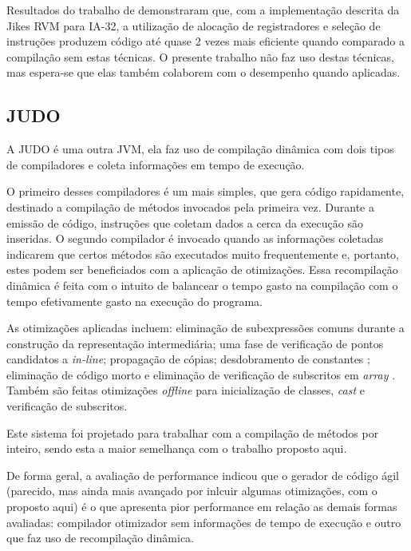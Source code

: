 Resultados do trabalho de  demonstraram que, com a
implementação descrita da Jikes RVM para IA-32, a
utilização de alocação de registradores e seleção de instruções
produzem código até quase 2 vezes mais eficiente quando comparado a
compilação sem estas técnicas. O presente trabalho não
faz uso destas técnicas, mas espera-se que elas também colaborem com
o desempenho quando aplicadas.


\subsection{JUDO}

A JUDO \cite{judo} é uma outra JVM, ela faz uso
de compilação dinâmica com dois tipos de compiladores e coleta
informações em tempo de execução.

O primeiro desses compiladores é um
mais simples, que gera código rapidamente, destinado a compilação
de métodos invocados pela primeira vez. Durante a emissão de código,
instruções que coletam dados a cerca da execução são inseridas.
O segundo compilador é
invocado quando as informações coletadas indicarem que certos métodos
são executados muito frequentemente e, portanto, estes podem ser
beneficiados com a aplicação de otimizações.
Essa recompilação dinâmica
é feita com o intuito de balancear o tempo gasto na compilação com o tempo
efetivamente gasto na execução do programa.

As otimizações aplicadas incluem: eliminação de subexpressões comuns
\cite{muchnick} durante a construção da representação intermediária;
uma fase de verificação de pontos candidatos a \textit{in-line};
propagação de cópias; desdobramento de constantes \cite{muchnick};
eliminação de código morto e eliminação de verificação de subscritos em
\textit{array} \cite{boundcheck}. Também são feitas otimizações
\textit{offline} para inicialização de classes, \textit{cast} e
verificação de subscritos.

Este sistema foi projetado para trabalhar com
a compilação de métodos por inteiro, sendo esta a maior semelhança com
o trabalho proposto aqui.

De forma geral, a avaliação de performance indicou que o gerador de
código ágil (parecido, mas ainda mais
avançado por inlcuir algumas otimizações, com o proposto aqui) é o que
apresenta pior performance em
relação as demais formas avaliadas: compilador otimizador sem
informações de tempo de execução e outro que faz uso de recompilação
dinâmica.

